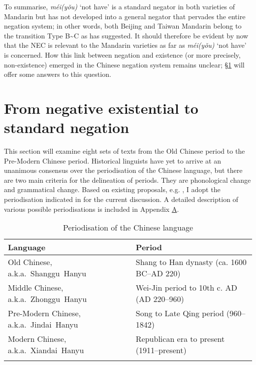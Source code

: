\documentclass[output=paper,colorlinks,citecolor=brown,chinesefont]{langscibook}
\begin{document}
\let\eachwordtwo=\upshape



To summarise, \textit{méi(yǒu)} `not have' is a standard negator in both varieties of Mandarin but has not developed into a general negator that pervades the entire negation system; in other words, both Beijing and Taiwan Mandarin belong to the transition Type B\sim C as \cite{Croft1991} has suggested. It should therefore be evident by now that the NEC is relevant to the Mandarin varieties as far as \textit{méi(yǒu)} `not have' is concerned. How this link between negation and existence (or more precisely, non-existence) emerged in the Chinese negation system remains unclear; §\ref{s:lam4} will offer some answers to this question.


\section{From negative existential to standard negation}\label{s:lam4}

This section will examine eight sets of texts from the Old Chinese period to the Pre-Modern Chinese period. Historical linguists have yet to arrive at an unanimous consensus over the periodisation of the Chinese language, but there are two main criteria for the delineation of periods. They are phonological change and grammatical change. Based on existing proposals, e.g. \citet{Karlgren1915,Wang1958,Pan1982,Norman1988,Ohta1988,Peyraube1988, Peyraube1996}, I adopt the periodisation indicated in  for the current discussion. A detailed description of various possible periodisations is included in Appendix \hyperlink{app:lamA}{A}.

\begin{table}
  \begin{tabularx}{\textwidth}{Ql}
    \lsptoprule
Language & Period\\
    \midrule
Old Chinese,\newline
    \mbox{a.k.a. Shanggu Hanyu} & Shang to Han dynasty (ca. 1600 BC–AD 220)\\
\tablevspace
Middle Chinese,\newline
    \mbox{a.k.a. Zhonggu Hanyu} &  Wei-Jin period to 10th c. AD (AD 220–960)\\
\tablevspace
Pre-Modern Chinese,\newline
    \mbox{a.k.a. Jindai Hanyu} &  Song to Late Qing period (960–1842)\\
\tablevspace
Modern Chinese,\newline
    \mbox{a.k.a. Xiandai Hanyu} & Republican era to present (1911–present)\\
\lspbottomrule
\end{tabularx}
  \caption{Periodisation of the Chinese language}
  \label{ex:lam14}
\end{table}
\end{document}
